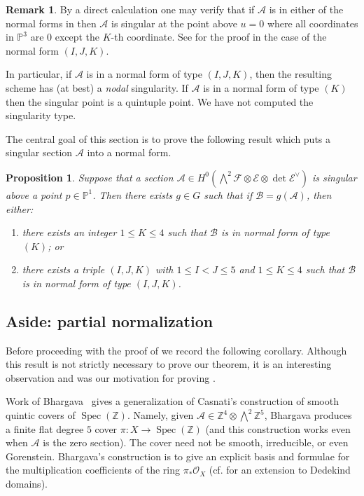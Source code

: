 \documentclass[11pt]{amsart}
\numberwithin{theorem}{section}
\numberwithin{equation}{section}
\newtheorem{proposition}[theorem]{Proposition}
\theoremstyle{definition}\newtheorem{defn}[theorem]{Definition}
\theoremstyle{definition}\newtheorem{remark}[theorem]{Remark}
\theoremstyle{definition}\newtheorem{question}[theorem]{Question}
\theoremstyle{definition}\newtheorem{problem}[theorem]{Problem}
\newcommand{\ZZ}{\mathbb{Z}}
\newcommand{\PP}{\mathbb{P}}
\newcommand{\cE}{\mathcal{E}}
\newcommand{\cF}{\mathcal{F}}
\newcommand{\cB}{\mathcal{B}}
\newcommand{\cA}{\mathcal{A}}
\newcommand{\cO}{\mathcal{O}}
\DeclareMathOperator{\Spec}{Spec}
\newcommand{\I}{I}
\newcommand{\J}{J}
\newcommand{\K}{K}
\begin{document}
\begin{remark}
By a direct calculation one may verify that if $\cA$ is in either of the normal forms in  then $\cA$ is singular at the point above $u = 0$ where all coordinates in $\PP^3$ are $0$ except the $\K$-th coordinate. See  for the proof in the case of the normal form $(\I,\J,\K)$. 

In particular, if $\cA$ is in a normal form of type $(\I,\J,\K)$, then the resulting scheme has (at best) a \emph{nodal} singularity. If $\cA$ is in a normal form of type $(\K)$ then the singular point is a quintuple point. We have not computed the singularity type. 
\end{remark}



The central goal of this section is to prove the following result which puts a singular section $\cA$ into a normal form.

\begin{proposition}
  \label{prop:move-stuff}
  Suppose that a section $\cA \in H^0(\bigwedge\nolimits^2 \cF \otimes \cE \otimes \det \cE^\vee )$ is singular above a point $p \in \PP^1$. Then there exists $g \in G$ such that if $\cB = g(\cA)$, then either:
  \begin{enumerate}[label=(\Alph*)]
      \item there exists an integer $1 \leq \K \leq 4$ such that $\cB$ is in normal form of type $(\K)$; or
      \item there exists a triple $(\I, \J, \K)$ with $1 \leq \I < \J \leq 5$ and $1 \leq \K \leq 4$ such that $\cB$ is in normal form of type $(\I, \J, \K)$.
  \end{enumerate}
\end{proposition}


\subsection{Aside: partial normalization}
Before proceeding with the proof of  we record the following corollary. Although this result is not strictly necessary to prove our theorem, it is an interesting observation and was our motivation for proving . 

Work of Bhargava~\cite{B-hcl4} gives a generalization of Casnati's construction of smooth quintic covers of $\Spec(\ZZ)$. Namely, given $\cA \in \ZZ^4 \otimes \bigwedge^2 \ZZ^5$, Bhargava produces a finite flat degree $5$ cover $\pi \colon X \rightarrow \Spec(\ZZ)$ (and this construction works even when $\cA$ is the zero section). The cover need not be smooth, irreducible, or even Gorenstein. Bhargava's construction is to give an explicit basis and formulae for the multiplication coefficients of the ring $\pi_* \cO_X$ (cf. \cite{evan} for an extension to Dedekind domains).  
\end{document}
